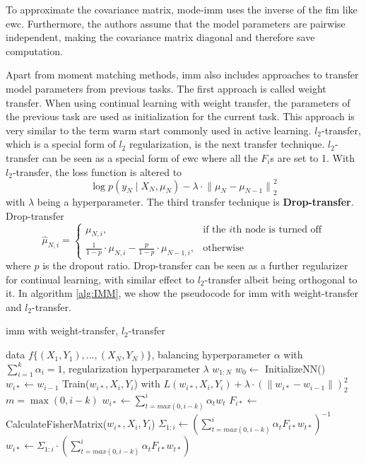 To approximate the covariance matrix, mode-\gls{imm} uses the inverse of the \gls{fim} like \gls{ewc}. Furthermore, the authors assume that
the model parameters are pairwise independent, making the covariance matrix diagonal and therefore save computation. \par
Apart from moment matching methods, \gls{imm} also includes approaches to transfer model parameters from previous tasks. The first approach is called
weight transfer. When using continual learning with weight transfer, the parameters of the previous task are used as initialization for the
current task. This approach is very similar to the term warm start commonly used in active learning. $l_2$-transfer, which is a special form of 
$l_2$ regularization, is the next transfer technique. $l_2$-transfer can be seen as a special form of \gls{ewc} where all the $F_i$s are set to 1. 
With $l_2$-transfer, the loss function is altered to
\begin{equation}
    \log p(y_N \mid X_N, \mu_N) - \lambda \cdot {\lVert \mu_N - \mu_{N-1} \rVert}^2_2
\end{equation}
with $\lambda$ being a hyperparameter. The third transfer technique is \textbf{Drop-transfer}. Drop-transfer
\begin{equation}
    \hat{\mu}_{N,i} = \begin{cases} \mu_{N,i}, & \text{if the }i \text{th node is turned off} \\
    \frac{1}{1-p} \cdot \mu_{N,i} - \frac{p}{1-p} \cdot \mu_{N-1,i}, & \text{otherwise}  \end{cases}
\end{equation}
where $p$ is the dropout ratio. Drop-transfer can be seen as a further regularizer for continual learning, with similar effect to $l_2$-transfer albeit
being orthogonal to it. In algorithm \ref{alg:IMM}, we show the pseudocode for \gls{imm} with weight-transfer and $l_2$-transfer. \par

\begin{algorithm}
    \caption{\gls{imm} with weight-transfer, $l_2$-transfer} \label{alg:IMM}
    \begin{algorithmic}
        \Require data $f\{ (X_1,Y_1),\ldots,(X_N,Y_N)\}$, balancing hyperparameter $\alpha$ with $\sum_{i=1}^k \alpha_i = 1$,
        regularization hyperparameter $\lambda$
        \return $w_{1:N}$
        \State $w_0 \leftarrow $ InitializeNN()
            \State $w_{i*} \leftarrow w_{i-1}$
            \State Train($w_{i*},X_i,Y_i$) with $L(w_{i*},X_i,Y_i) + \lambda \cdot (\lVert w_{i*} - w_{i-1} \rVert)^2_2$
            \State $m=\max (0,i-k)$
            \State $w_{i*} \leftarrow \sum_{t=max(0,i-k)}^i \alpha_t w_{t}$
            \State $F_{i*} \leftarrow$ CalculateFisherMatrix($w_{i*},X_i,Y_i$)
            \State $\Sigma_{1:i} \leftarrow (\sum_{t=max(0,i-k)}^i \alpha_t F_{t*} w_{t*})^{-1}$
            \State $w_{i*} \leftarrow \Sigma_{1:i} \cdot (\sum_{t=max(0,i-k)}^i \alpha_t F_{t*} w_{t*})$
            \EndIf
        \EndFor
    \end{algorithmic}
\end{algorithm}

